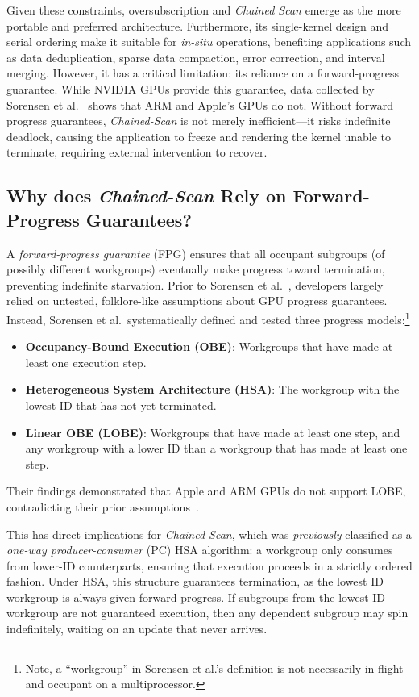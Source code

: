 \documentclass[sigconf]{acmart}
\begin{document}
Given these constraints, oversubscription and \emph{Chained Scan} emerge as the more portable and preferred architecture. Furthermore, its single-kernel design and serial ordering make it suitable for \emph{in-situ} operations, benefiting applications such as data deduplication, sparse data compaction, error correction, and interval merging. However, it has a critical limitation: its reliance on a forward-progress guarantee. While NVIDIA GPUs provide this guarantee, data collected by Sorensen et al.~\cite{sorensen2021} shows that ARM and Apple’s GPUs do not. Without forward progress guarantees, \emph{Chained-Scan} is not merely inefficient---it risks indefinite deadlock, causing the application to freeze and rendering the kernel unable to terminate, requiring external intervention to recover.

\subsection{Why does \emph{Chained-Scan} Rely on Forward-Progress Guarantees?}
A \emph{forward-progress guarantee} (FPG) ensures that all occupant subgroups (of possibly different workgroups) eventually make progress toward termination, preventing indefinite starvation. Prior to Sorensen et al.~\cite{sorensen2018,sorensen2021}, developers largely relied on untested, folklore-like assumptions about GPU progress guarantees. Instead, Sorensen et al.\ systematically defined and tested three progress models:\footnote{Note, a ``workgroup'' in Sorensen et al.'s definition is not necessarily in-flight and occupant on a multiprocessor.}
\begin{itemize}
  \item \textbf{Occupancy-Bound Execution (OBE)}: Workgroups that have made at least one execution step.
  \item \textbf{Heterogeneous System Architecture (HSA)}: The workgroup with the lowest ID that has not yet terminated.
  \item \textbf{Linear OBE (LOBE)}: Workgroups that have made at least one step, and any workgroup with a lower ID than a workgroup that has made at least one step.
\end{itemize}
Their findings demonstrated that Apple and ARM GPUs do not support LOBE, contradicting their prior assumptions~\cite{sorensen2018}.

This has direct implications for \emph{Chained Scan}, which was \emph{previously} classified as a \emph{one-way producer-consumer} (PC) HSA algorithm: a workgroup only consumes from lower-ID counterparts, ensuring that execution proceeds in a strictly ordered fashion. Under HSA, this structure guarantees termination, as the lowest ID workgroup is always given forward progress. If subgroups from the lowest ID workgroup are not guaranteed execution, then any dependent subgroup may spin indefinitely, waiting on an update that never arrives.
\end{document}
